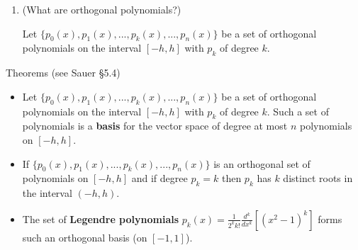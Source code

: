 \documentclass[12pt,letterpaper,noanswers]{exam}
\begin{document}
\begin{enumerate}[resume=classQ]
\item %

(What are orthogonal polynomials?)

Let $\{p_0(x),p_1(x),...,p_k(x),...,p_n(x)\}$ be a set of orthogonal polynomials on the interval $[-h,h]$ with $p_k$ of degree $k$.
\end{enumerate}
\begin{tcolorbox}
Theorems (see Sauer \S 5.4)

\begin{itemize}
\itemsep0pt
    \item Let $\{p_0(x),p_1(x),...,p_k(x),...,p_n(x)\}$ be a set of orthogonal polynomials on the interval $[-h,h]$ with $p_k$ of degree $k$.  Such a set of polynomials is a \textbf{basis} for the vector space of degree at most $n$ polynomials on $[-h,h]$.
    \item If $\{p_0(x),p_1(x),...,p_k(x),...,p_n(x)\}$ is an orthogonal set of polynomials on $[-h,h]$ and if degree $p_k = k$ then $p_k$ has $k$ distinct roots in the interval $(-h,h)$.
    \item The set of \textbf{Legendre polynomials} $\displaystyle p_k(x) = \frac{1}{2^kk!}\frac{d^k}{dx^k}\left[(x^2-1)^k\right]$ forms such an orthogonal basis (on $[-1,1]$).
\end{itemize}
\end{tcolorbox}
\end{document}
